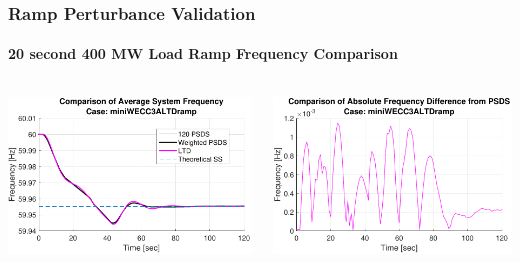 \documentclass[14pt, unknownkeysallowed]{beamer}
\begin{document}
\begin{frame}
\frametitle{Ramp Perturbance Validation}
\framesubtitle{20 second 400 MW Load Ramp Frequency Comparison}
\begin{columns}
	\begin{column}{.5\linewidth}
		\includegraphics[width=\linewidth]{miniWECC3ALTDrampF3}
	\end{column}
	\begin{column}{.5\linewidth}
		\includegraphics[width=\linewidth]{miniWECC3ALTDrampRelF}
	\end{column}
\end{columns}
\end{frame}
\end{document}
